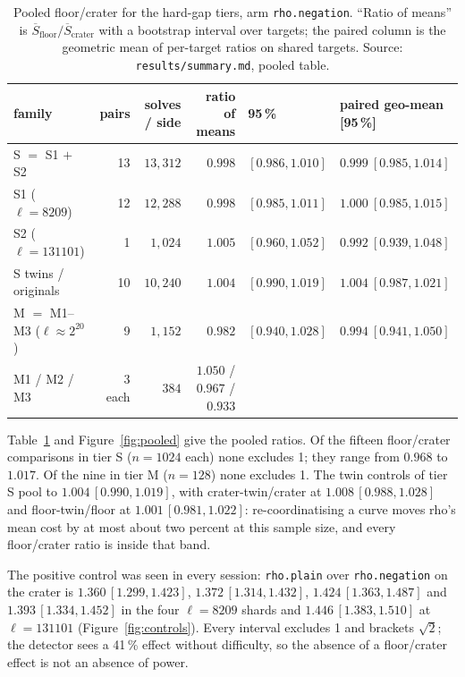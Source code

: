 \documentclass[10pt,a4paper]{article}
\newcommand{\artefact}[1]{\texttt{\small #1}}
\theoremstyle{remark}
\begin{document}
\begin{table}[t]
\centering\footnotesize
\begin{tabular}{lrrrll}
\toprule
family & pairs & solves / side & ratio of means & 95\,\% & paired geo-mean [95\,\%] \\
\midrule
S $=$ S1 $+$ S2 & 13 & $13{,}312$ & $\mathbf{0.998}$ & $[0.986, 1.010]$ & $0.999\ [0.985, 1.014]$ \\
\quad S1 ($\ell = 8209$) & 12 & $12{,}288$ & $0.998$ & $[0.985, 1.011]$ & $1.000\ [0.985, 1.015]$ \\
\quad S2 ($\ell = 131101$) & 1 & $1{,}024$ & $1.005$ & $[0.960, 1.052]$ & $0.992\ [0.939, 1.048]$ \\
\quad S twins / originals & 10 & $10{,}240$ & $1.004$ & $[0.990, 1.019]$ & $1.004\ [0.987, 1.021]$ \\
M $=$ M1--M3 ($\ell \approx 2^{20}$) & 9 & $1{,}152$ & $\mathbf{0.982}$ & $[0.940, 1.028]$ & $0.994\ [0.941, 1.050]$ \\
\quad M1 / M2 / M3 & 3 each & $384$ & $1.050$ / $0.967$ / $0.933$ & & \\
\bottomrule
\end{tabular}
\caption{Pooled floor/crater for the hard-gap tiers, arm
\texttt{rho.negation}. ``Ratio of means'' is $\overline{S}_{\mathrm{floor}} /
\overline{S}_{\mathrm{crater}}$ with a bootstrap interval over targets;
the paired column is the geometric mean of per-target ratios on shared
targets. Source: \artefact{results/summary.md}, pooled table.}
\label{tab:hard}
\end{table}

Table~\ref{tab:hard} and Figure~\ref{fig:pooled} give the pooled
ratios. Of the fifteen floor/crater comparisons in tier S ($n = 1024$
each) none excludes 1; they range from $0.968$ to $1.017$. Of the nine
in tier M ($n = 128$) none excludes 1. The twin controls of tier S pool
to $1.004\,[0.990, 1.019]$, with crater-twin/crater at
$1.008\,[0.988, 1.028]$ and floor-twin/floor at $1.001\,[0.981, 1.022]$:
re-coordinatising a curve moves rho's mean cost by at most about two
percent at this sample size, and every floor/crater ratio is inside that
band.

The positive control was seen in every session: \texttt{rho.plain} over
\texttt{rho.negation} on the crater is $1.360\,[1.299, 1.423]$,
$1.372\,[1.314, 1.432]$, $1.424\,[1.363, 1.487]$ and
$1.393\,[1.334, 1.452]$ in the four $\ell = 8209$ shards and
$1.446\,[1.383, 1.510]$ at $\ell = 131101$ (Figure~\ref{fig:controls}).
Every interval excludes 1 and brackets $\sqrt2$; the detector sees a
41\,\% effect without difficulty, so the absence of a floor/crater effect
is not an absence of power.
\end{document}
